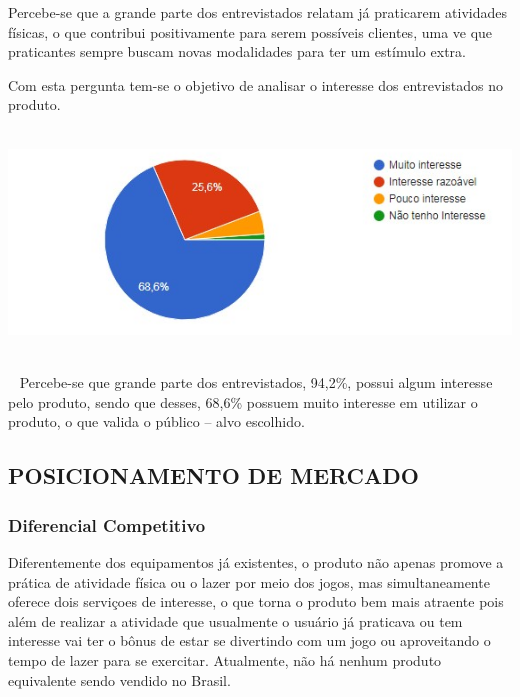 \begin{apendicesenv}
Percebe-se que a grande parte dos entrevistados relatam já praticarem atividades físicas, o que contribui positivamente para serem possíveis clientes, uma ve que praticantes sempre buscam novas modalidades para ter um estímulo extra. 


Com esta pergunta tem-se o objetivo de analisar o interesse dos entrevistados  no produto. 
 
 \begin{center}
    \includegraphics[scale=0.7]{figuras/interesse}
       \label{interesse}
 \end{center}   
Percebe-se que grande parte dos entrevistados, 94,2\%, possui algum interesse pelo produto, sendo que desses, 68,6\% possuem muito interesse em utilizar o produto, o que valida o público – alvo escolhido. 


\subsection{POSICIONAMENTO DE MERCADO} 

\subsubsection{ Diferencial Competitivo}

Diferentemente dos equipamentos já existentes, o produto não apenas promove a prática de atividade física ou o lazer por meio dos jogos, mas simultaneamente oferece dois serviçoes de interesse, o que torna o produto bem mais atraente pois além de realizar a atividade que usualmente o usuário já praticava ou tem interesse vai ter o bônus de estar se divertindo com um jogo ou aproveitando o tempo de lazer para se exercitar.
Atualmente, não há nenhum produto equivalente sendo vendido no Brasil. 


\end{apendicesenv}
